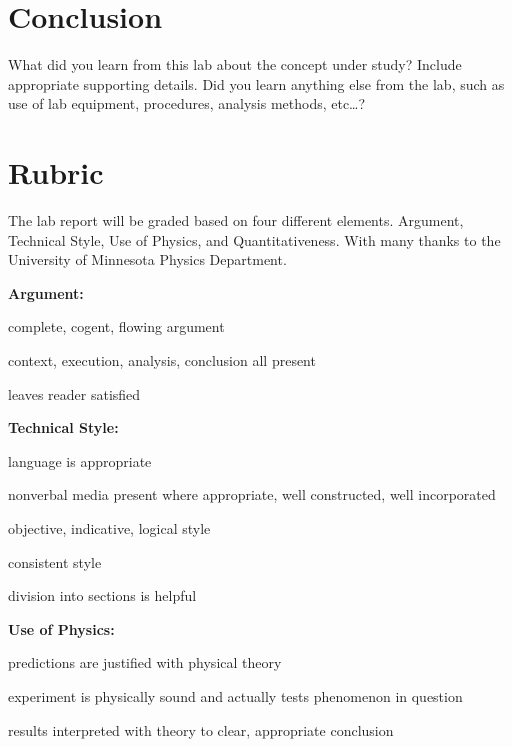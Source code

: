 \documentclass[
    10pt,aps,prl,
    amsfonts,
    amssymb,
    amsmath,
    draft,
    runinaddress,
    secnum,
    showkeys,
    superscriptaddress,
    twocolumn,
]{revtex4}
\begin{document}
\section{Conclusion}
    \label{sec:conclusion}
    What did you learn from this lab about the concept under study? 
    Include appropriate supporting details. 
    Did you learn anything else from the lab, 
        such as use of lab equipment, procedures,
        analysis methods, etc\dots{}?


\appendix

\section{Rubric}
\label{sec:rubric}
    The lab report will be graded based on four different elements.
    Argument, Technical Style, Use of Physics, and Quantitativeness.
    With many thanks to the University of Minnesota Physics Department\cite{UMNrubric}.

    \textbf{Argument:}
    \begin{itemize*}
        \item complete, cogent, flowing argument
        \item context, execution, analysis, conclusion all present
        \item leaves reader satisfied
    \end{itemize*}

    \textbf{Technical Style:}
    \begin{itemize*}
        \item language is appropriate
        \item nonverbal media present where appropriate, well constructed, well incorporated
        \item objective, indicative, logical style
        \item consistent style
        \item division into sections is helpful
    \end{itemize*}

    \textbf{Use of Physics:}
    \begin{itemize*}
        \item predictions are justified with physical theory
        \item experiment is physically sound and actually tests phenomenon in question
        \item results interpreted with theory to clear, appropriate conclusion
    \end{itemize*}
\end{document}

